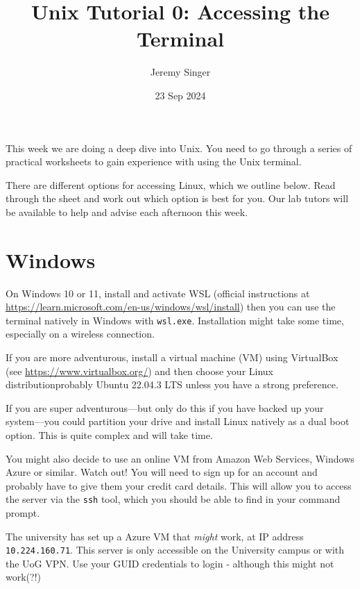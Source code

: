 \documentclass{article}
\begin{document}
\title{Unix Tutorial 0: Accessing the Terminal}
\author{Jeremy Singer}
\date{23 Sep 2024}
\maketitle





This week we are doing a deep dive into Unix. You need to go
through a series of practical worksheets to gain experience with
using the Unix terminal.

There are different options for accessing Linux, which we outline
below. Read through the sheet and work out which option is best
for you. Our lab tutors will be available to help and advise each
afternoon this week.



\section*{Windows}

On Windows 10 or 11, install and activate WSL (official instructions at \url{https://learn.microsoft.com/en-us/windows/wsl/install}) then you can use the terminal natively in Windows with \texttt{wsl.exe}. Installation might take some time, especially on a wireless connection.

If you are more adventurous, install a virtual machine (VM) using VirtualBox
(see \url{https://www.virtualbox.org/}) and then choose your Linux distributionprobably Ubuntu 22.04.3 LTS unless you have a strong preference.

If you are super adventurous---but only do this if you have backed up your system---you could partition your drive and install Linux natively as a dual boot option. This is quite complex and will take time.

You might also decide to use an online VM from Amazon Web Services, Windows Azure or similar. Watch out! You will need to sign up for an account and probably have to give them your credit card details.
This will allow you to access the server via the \texttt{ssh} tool, which you should be able to find in your command prompt.

The university has set up a Azure VM that \emph{might} work, at IP address
\texttt{10.224.160.71}. This server is only accessible on the University campus or with the UoG VPN.
Use your GUID credentials to login - although this might not work(?!)
\end{document}
